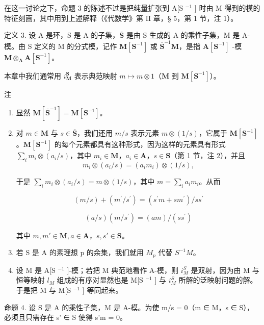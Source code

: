 在这一讨论之下，命题 3 的陈述不过是把纯量扩张到 A{[}S \(^{-1}\) {]} 时由 M 得到的模的特征刻画，其中用到上述解释（《代数学》第 II 章，§ 5，第 1 节，注 1）。

定义 3. 设 A 是环，S 是 A 的子集，\(\overline{\mathbf{S}}\) 是由 S 生成的 A 的乘性子集，M 是 A-模。由 S 定义的 M 的分式模，记作 \(\mathbf{M}[\mathbf{S}^{-1}]\) 或 \(\overline{\mathbf{S}}^{-1}\mathbf{M}\)，是指 \(\mathbf{A}[\mathbf{S}^{-1}]\) -模 \(\mathbf{M} \otimes_{\mathbf{A}} \mathbf{A}[\mathbf{S}^{-1}]\)。

本章中我们通常用 \(i_{\mathbf{M}}^{\mathbf{S}}\) 表示典范映射 \(m \mapsto m \otimes 1\)（\(\mathbf{M}\) 到 \(\mathbf{M}[\mathbf{S}^{-1}]\)）。

注

\begin{enumerate}
\def\labelenumi{(\arabic{enumi})}
\item
  显然 \(\mathbf{M}[\overline{\mathbf{S}}^{-1}] = \mathbf{M}[\mathbf{S}^{-1}]\)。
\item
  对 \(m \in \mathbf{M}\) 与 \(s \in \overline{\mathbf{S}}\)，我们还用 \(m / s\) 表示元素 \(m \otimes (1 / s)\)，它属于 \(\mathbf{M}[\mathbf{S}^{-1}]\)。\(\mathbf{M}[\mathbf{S}^{-1}]\) 的每个元素都具有这种形式，因为这样的元素具有形式 \(\sum_{i} m_i \otimes (a_i / s)\)，其中 \(m_i \in \mathbf{M}\)，\(a_i \in \mathbf{A}\)，\(s \in \mathbf{S}\)（第 1 节，注 2），并且
\[
m _ {i} \otimes (a _ {i} / s) = (a _ {i} m _ {i}) \otimes (1 / s),
\]

于是 \(\sum_{i} m_{i} \otimes (a_{i}/s) = m \otimes (1/s)\)，其中 \(m = \sum_{i} a_{i} m_{i}\)。从而


\[
(m / s) + (m ^ {\prime} / s ^ {\prime}) = (s ^ {\prime} m + s m ^ {\prime}) / s s ^ {\prime}\tag{4}
\]

\[
(a / s) (m / s ^ {\prime}) = (a m) / (s s ^ {\prime})\tag{5}
\]

其中 \(m, m' \in \mathbf{M}, a \in \mathbf{A}\)，\(s, s' \in \mathbf{S}\)。

\item
  若 S 是 A 的素理想 p 的余集，我们就用 \(M_{p}\) 代替 \(S^{-1}M\)。
\item
  设 M 是 A{[}S \(^{-1}\) {]}-模；若把 M 典范地看作 A-模，则 \(i_{M}^{S}\) 是双射，因为由 M 与恒等映射 \(l_{M}\) 组成的有序对显然也是 M{[}S \(^{-1}\) {]} 与 \(i_{M}^{S}\) 所解的泛映射问题的解。于是把 M 与 M{[}S \(^{-1}\) {]} 等同起来。
\end{enumerate}

命题 4. 设 S 是 A 的乘性子集，M 是 A-模。为使 m/s = 0（m ∈ M，s ∈ S），必须且只需存在 s' ∈ S 使得 s'm = 0。

